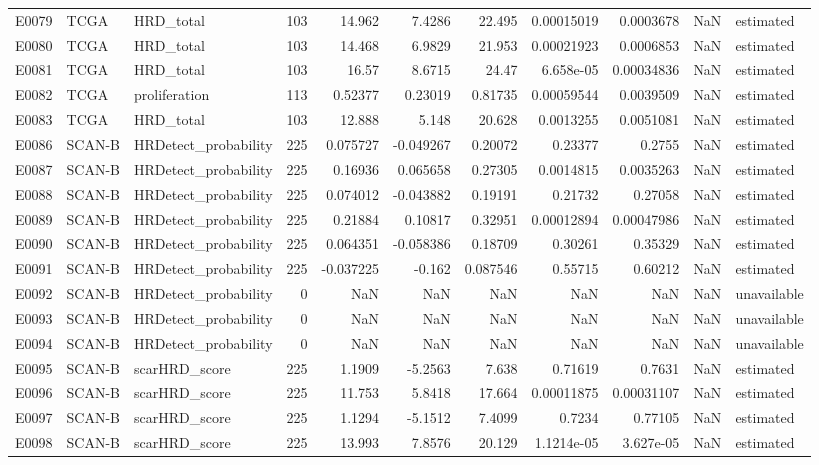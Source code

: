 \begin{longtable}{lllrrrrrrrl}
E0079 & TCGA & HRD\_total & 103 & 14.962 & 7.4286 & 22.495 & 0.00015019 & 0.0003678 & NaN & estimated \\
E0080 & TCGA & HRD\_total & 103 & 14.468 & 6.9829 & 21.953 & 0.00021923 & 0.0006853 & NaN & estimated \\
E0081 & TCGA & HRD\_total & 103 & 16.57 & 8.6715 & 24.47 & 6.658e-05 & 0.00034836 & NaN & estimated \\
E0082 & TCGA & proliferation & 113 & 0.52377 & 0.23019 & 0.81735 & 0.00059544 & 0.0039509 & NaN & estimated \\
E0083 & TCGA & HRD\_total & 103 & 12.888 & 5.148 & 20.628 & 0.0013255 & 0.0051081 & NaN & estimated \\
E0086 & SCAN-B & HRDetect\_probability & 225 & 0.075727 & -0.049267 & 0.20072 & 0.23377 & 0.2755 & NaN & estimated \\
E0087 & SCAN-B & HRDetect\_probability & 225 & 0.16936 & 0.065658 & 0.27305 & 0.0014815 & 0.0035263 & NaN & estimated \\
E0088 & SCAN-B & HRDetect\_probability & 225 & 0.074012 & -0.043882 & 0.19191 & 0.21732 & 0.27058 & NaN & estimated \\
E0089 & SCAN-B & HRDetect\_probability & 225 & 0.21884 & 0.10817 & 0.32951 & 0.00012894 & 0.00047986 & NaN & estimated \\
E0090 & SCAN-B & HRDetect\_probability & 225 & 0.064351 & -0.058386 & 0.18709 & 0.30261 & 0.35329 & NaN & estimated \\
E0091 & SCAN-B & HRDetect\_probability & 225 & -0.037225 & -0.162 & 0.087546 & 0.55715 & 0.60212 & NaN & estimated \\
E0092 & SCAN-B & HRDetect\_probability & 0 & NaN & NaN & NaN & NaN & NaN & NaN & unavailable \\
E0093 & SCAN-B & HRDetect\_probability & 0 & NaN & NaN & NaN & NaN & NaN & NaN & unavailable \\
E0094 & SCAN-B & HRDetect\_probability & 0 & NaN & NaN & NaN & NaN & NaN & NaN & unavailable \\
E0095 & SCAN-B & scarHRD\_score & 225 & 1.1909 & -5.2563 & 7.638 & 0.71619 & 0.7631 & NaN & estimated \\
E0096 & SCAN-B & scarHRD\_score & 225 & 11.753 & 5.8418 & 17.664 & 0.00011875 & 0.00031107 & NaN & estimated \\
E0097 & SCAN-B & scarHRD\_score & 225 & 1.1294 & -5.1512 & 7.4099 & 0.7234 & 0.77105 & NaN & estimated \\
E0098 & SCAN-B & scarHRD\_score & 225 & 13.993 & 7.8576 & 20.129 & 1.1214e-05 & 3.627e-05 & NaN & estimated \\

\end{longtable}
